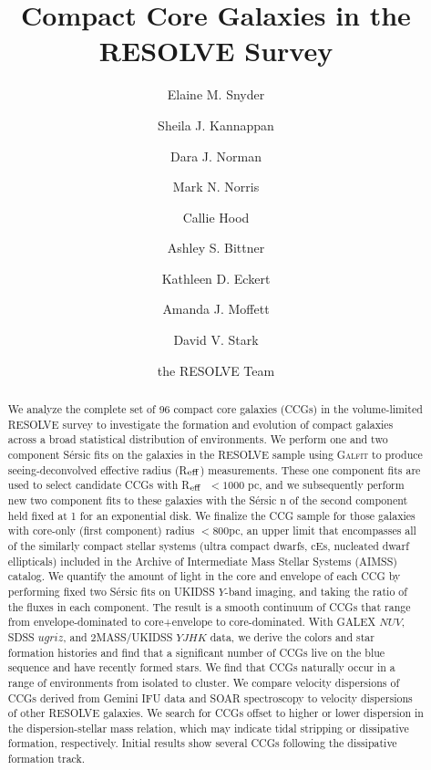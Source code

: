 \documentclass[iop,apj]{emulateapj}
\newcommand{\Reff}{R$_{\rm eff}$}
\begin{document}
\title{Compact Core Galaxies in the RESOLVE Survey}
\author{Elaine M. Snyder}
\author{Sheila J. Kannappan}
\author{Dara J. Norman}
\author{Mark N. Norris}
\author{Callie Hood}
\author{Ashley S. Bittner}
\author{Kathleen D. Eckert}
\author{Amanda J. Moffett}
\author{David V. Stark}
\author{the RESOLVE Team}
\begin{abstract}
We analyze the complete set of 96 compact core galaxies (CCGs) in the volume-limited RESOLVE survey to investigate the formation and evolution of compact galaxies across a broad statistical distribution of environments. We perform one and two component S\'ersic fits on the galaxies in the RESOLVE sample using \textsc{Galfit} to produce seeing-deconvolved effective radius (\Reff) measurements. These one component fits are used to select candidate CCGs with \Reff\ $< 1000$ pc, and we subsequently perform new two component fits to these galaxies with the S\'ersic n of the second component held fixed at 1 for an exponential disk. We finalize the CCG sample for those galaxies with core-only (first component) radius $<800$pc, an upper limit that encompasses all of the similarly compact stellar systems (ultra compact dwarfs, cEs, nucleated dwarf ellipticals) included in the Archive of Intermediate Mass Stellar Systems (AIMSS) catalog. We quantify the amount of light in the core and envelope of each CCG by performing fixed two S\'ersic fits on UKIDSS $Y$-band imaging, and taking the ratio of the fluxes in each component. The result is a smooth continuum of CCGs that range from envelope-dominated to core+envelope to core-dominated. With GALEX $NUV$, SDSS $ugriz$, and 2MASS/UKIDSS $YJHK$ data, we derive the colors and star formation histories and find that a significant number of CCGs live on the blue sequence and have recently formed stars. We find that CCGs naturally occur in a range of environments from isolated to cluster. We compare velocity dispersions of CCGs derived from Gemini IFU data and SOAR spectroscopy to velocity dispersions of other RESOLVE galaxies. We search for CCGs offset to higher or lower dispersion in the dispersion-stellar mass relation, which may indicate tidal stripping or dissipative formation, respectively. Initial results show several CCGs following the dissipative formation track.
\end{abstract}
\end{document}
